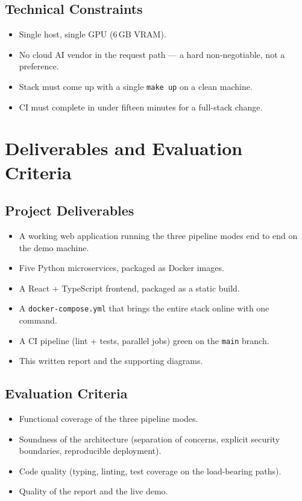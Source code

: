 \documentclass[12pt, a4paper]{report}
\begin{document}
\subsection{Technical Constraints}

\begin{itemize}
    \item Single host, single GPU (6\,GB VRAM).
    \item No cloud AI vendor in the request path --- a hard
        non-negotiable, not a preference.
    \item Stack must come up with a single \texttt{make up} on a
        clean machine.
    \item CI must complete in under fifteen minutes for a
        full-stack change.
\end{itemize}

\section{Deliverables and Evaluation Criteria}

\subsection{Project Deliverables}

\begin{itemize}
    \item A working web application running the three pipeline modes
        end to end on the demo machine.
    \item Five Python microservices, packaged as Docker images.
    \item A React + TypeScript frontend, packaged as a static build.
    \item A \texttt{docker-compose.yml} that brings the entire stack
        online with one command.
    \item A CI pipeline (lint + tests, parallel jobs) green on the
        \texttt{main} branch.
    \item This written report and the supporting diagrams.
\end{itemize}

\subsection{Evaluation Criteria}

\begin{itemize}
    \item Functional coverage of the three pipeline modes.
    \item Soundness of the architecture (separation of concerns,
        explicit security boundaries, reproducible deployment).
    \item Code quality (typing, linting, test coverage on the
        load-bearing paths).
    \item Quality of the report and the live demo.
\end{itemize}
\end{document}
